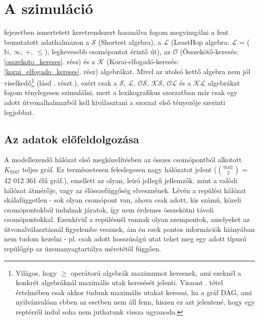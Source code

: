   \section{A szimuláció}
   fejezetben ismertetett keretrendszert használva fogom megvizsgálni a fent bemutatott adathalmazon a $\mathcal{S}$ (Shortest algebra), a $\mathcal{L}$ (LeastHop algebra: $\mathcal{L}$ = ($\mathbb{N},~\infty,~+,~\leq$), legkevesebb csomópontot érintő út), az $\mathcal{O}$ (Összekötő-keresés: \ref{osszekoto_kereses}. rész) és a $\mathcal{K}$ (Korai-elfogadó-keresés: \ref{korai_elfogado_kereses}. rész) algebrákat. Mivel az utolsó kettő algebra nem jól viselkedő\footnote{Világos, hogy $\geq$ operátorú algebrák maximumot keresnek, ami ezeknél a konkrét algebráknál maximális utak keresését jelenti. Viszont . tétel értelmében csak akkor tudunk maximális utakat keresni, ha a gráf DAG, ami nyilvánvalóan ebben az esetben nem áll fenn, hiszen ez azt jelentené, hogy egy reptérről indul soha nem juthatunk vissza ugyanoda.} (lásd . részt.), ezért csak a $\mathcal{S}$, $\mathcal{L}$, $\mathcal{OS}$, $\mathcal{KS}$, $\mathcal{OL}$ és a $\mathcal{KL}$ algebrákat fogom ténylegesen szimulálni, mert a lexikografikus szorzatban már csak egy adott útvonalhalmazból kell kiválasztani a szorzat első tényezője szerinti legjobbat.

    \subsection{Az adatok előfeldolgozása}
    A modellezendő hálózat első megközelítésben az összes csomópontból alkotott $K_{9167}$ teljes gráf. Ez természetesen feleslegesen nagy hálózatot jelent ($9167 \choose 2$ = 42 012 361 élű gráf.), emellett az olyan, leíró jellegű jellemzők, mint a valódi hálózat átmérője, vagy az élösszefüggőség elvesznének. Lévén a repülési hálózat skálafüggetlen - sok olyan csomópont van, ahova csak adott, kis számú, közeli csomópontokból indulnak járatok, így nem érdemes összekötni távoli csomópontokkal. Ezenkívül a repülésnél vannak olyan szempontok, amelyeket az útvonalválasztásnál figyelembe vesznek, ám én ezek pontos információk hiányában nem tudom kezelni - pl. csak adott hosszúságú utat tehet meg egy adott típusú repülőgép az üzemanyagtartálya méretétől függően.\\

